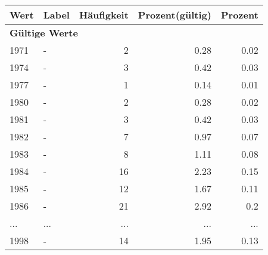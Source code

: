      \begin{longtable}{lXrrr}
     \toprule
     \textbf{Wert} & \textbf{Label} & \textbf{Häufigkeit} & \textbf{Prozent(gültig)} & \textbf{Prozent} \\
     \endhead
     \midrule
     \multicolumn{5}{l}{\textbf{Gültige Werte}}\\
        1971 & \multicolumn{1}{X}{-} & %
          \num{2} &
          \num[round-mode=places,round-precision=2]{0,28} &
          \num[round-mode=places,round-precision=2]{0,02} \\
        1974 & \multicolumn{1}{X}{-} & %
          \num{3} &
          \num[round-mode=places,round-precision=2]{0,42} &
          \num[round-mode=places,round-precision=2]{0,03} \\
        1977 & \multicolumn{1}{X}{-} & %
          \num{1} &
          \num[round-mode=places,round-precision=2]{0,14} &
          \num[round-mode=places,round-precision=2]{0,01} \\
        1980 & \multicolumn{1}{X}{-} & %
          \num{2} &
          \num[round-mode=places,round-precision=2]{0,28} &
          \num[round-mode=places,round-precision=2]{0,02} \\
        1981 & \multicolumn{1}{X}{-} & %
          \num{3} &
          \num[round-mode=places,round-precision=2]{0,42} &
          \num[round-mode=places,round-precision=2]{0,03} \\
        1982 & \multicolumn{1}{X}{-} & %
          \num{7} &
          \num[round-mode=places,round-precision=2]{0,97} &
          \num[round-mode=places,round-precision=2]{0,07} \\
        1983 & \multicolumn{1}{X}{-} & %
          \num{8} &
          \num[round-mode=places,round-precision=2]{1,11} &
          \num[round-mode=places,round-precision=2]{0,08} \\
        1984 & \multicolumn{1}{X}{-} & %
          \num{16} &
          \num[round-mode=places,round-precision=2]{2,23} &
          \num[round-mode=places,round-precision=2]{0,15} \\
        1985 & \multicolumn{1}{X}{-} & %
          \num{12} &
          \num[round-mode=places,round-precision=2]{1,67} &
          \num[round-mode=places,round-precision=2]{0,11} \\
        1986 & \multicolumn{1}{X}{-} & %
          \num{21} &
          \num[round-mode=places,round-precision=2]{2,92} &
          \num[round-mode=places,round-precision=2]{0,2} \\
       ... & ... & ... & ... & ... \\
        1998 & \multicolumn{1}{X}{-} & %
          \num{14} &
          \num[round-mode=places,round-precision=2]{1,95} &
          \num[round-mode=places,round-precision=2]{0,13} \\


\end{longtable}
